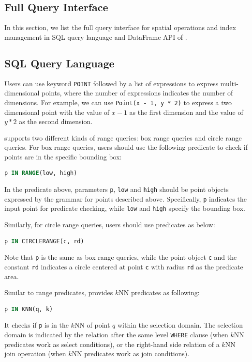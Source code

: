 \begin{appendix}

\lstset{basicstyle=\small\ttfamily}

\section{\name Full Query Interface}
\label{sec:fullquery}
In this section, we list the full query interface for spatial operations and index
management in SQL query language and DataFrame API of \name.

\subsection{SQL Query Language}
 Users can use keyword \texttt{POINT} followed by a list of
expressions to express multi-dimensional points, where the number of expressions
indicates the number of dimensions. For example, we can use \texttt{Point(x - 1, y * 2)}
to express a two dimensional point with the value of $x - 1$ as the first dimension
and the value of $y * 2$ as the second dimension.

 \name supports two different kinds of range queries:
box range queries and circle range queries. For box range queries, users should
use the following predicate to check if points are in the specific bounding box:
\begin{lstlisting}[language=SQL]
p IN RANGE(low, high)
\end{lstlisting}
In the predicate above, parameters \texttt{p}, \texttt{low} and \texttt{high}
should be point objects expressed by the grammar for points described above.
Specifically, \texttt{p} indicates the input point for predicate checking, while
\texttt{low} and \texttt{high} specify the bounding box.

Similarly, for circle range queries, users should use predicates as below:
\begin{lstlisting}[language=SQL]
p IN CIRCLERANGE(c, rd)
\end{lstlisting}
Note that \texttt{p} is the same as box range queries, while the point object
\texttt{c} and the constant \texttt{rd} indicates a circle centered at point
\texttt{c} with radius \texttt{rd} as the predicate area.

 Similar to range predicates, \name provides $k$NN
predicates as following:
\begin{lstlisting}[language=SQL]
p IN KNN(q, k)
\end{lstlisting}
It checks if \texttt{p} is in the $k$NN of point $q$ within the selection
domain. The selection domain is indicated by the relation after the same
level \texttt{WHERE} clause (when $k$NN predicates work as select conditions),
or the right-hand side relation of a $k$NN join operation (when $k$NN predicates
work as join conditions).


\end{appendix}
